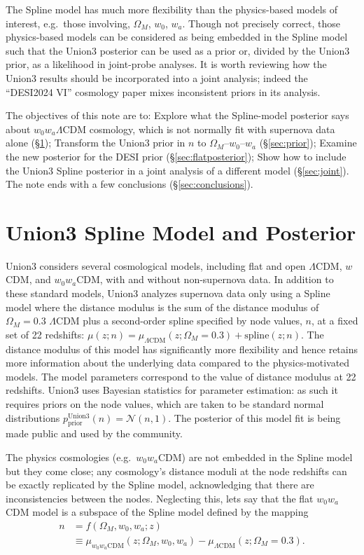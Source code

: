 \documentclass{aastex631}
\begin{document}
The Spline model has much more flexibility than the physics-based models of interest, e.g.\ those involving, $\Omega_M$,
$w_0$, $w_a$.  Though not precisely correct, those physics-based models can be considered as being embedded in the Spline
model such that the Union3  posterior can  be used as a prior or, divided by the Union3 prior, as a likelihood in joint-probe analyses.   It is worth reviewing
how the Union3 results should be incorporated into a joint analysis; indeed the ``DESI2024 VI''
cosmology paper  \cite{2024arXiv240403002D} mixes inconsistent priors in its analysis.

The objectives of this note are to: Explore what the Spline-model posterior says about $w_0w_a\Lambda$CDM cosmology, which is not normally
fit with  supernova data alone (\S\ref{sec:union3}); Transform the Union3 prior in $n$ to $\Omega_M$--$w_0$--$w_a$
(\S\ref{sec:prior});
Examine the new posterior for the DESI prior
(\S\ref{sec:flatposterior}); Show how to include the Union3 Spline posterior in a joint analysis of a different model (\S\ref{sec:joint}).
The note ends with a few conclusions (\S\ref{sec:conclusions}).

\section{Union3 Spline Model and Posterior}
\label{sec:union3}
Union3 considers several cosmological models, including  flat and open $\Lambda$CDM, $w$CDM, and $w_0w_a$CDM,
with and without non-supernova data.
In addition to these standard models,  Union3 analyzes supernova data only using a Spline model where the  distance modulus
is the sum of the distance modulus of $\Omega_M=0.3$  $\Lambda$CDM plus a second-order spline specified by node values, $n$,
at a fixed set of 22 redshifts: $\mu(z;n) = \mu_{\Lambda \text{CDM}}(z;\Omega_M=0.3) + \text{spline}(z;n)$.  The distance modulus of this model has significantly more flexibility 
and hence retains more information about the underlying data compared to the physics-motivated models.
The model parameters correspond to the value of distance modulus at 22 redshifts.
Union3 uses Bayesian statistics for parameter estimation: as such it requires 
priors on the node values, which are taken to be standard normal distributions
$p^\text{Union3}_\text{prior}(n)=  \mathcal{N}(n,1)$.
The posterior of this model fit is being made public and used by the community.

The physics cosmologies (e.g.\ $w_0w_a$CDM)  are not embedded in the Spline model but 
they come close; any cosmology's distance moduli at the node redshifts can be exactly replicated by the Spline model, acknowledging that
there are
inconsistencies between the nodes.  Neglecting this, lets say that the flat $w_0w_a$CDM model
is a subspace of the Spline model defined by the mapping
\begin{align}
	n &= f(\Omega_M, w_0, w_a; z) \\
	& \equiv \mu_{w_0 w_a \text{CDM}}(z;\Omega_M, w_0, w_a)  - \mu_{\Lambda \text{CDM}}(z;\Omega_M=0.3). \label{eqn:f}
\end{align}
\end{document}
